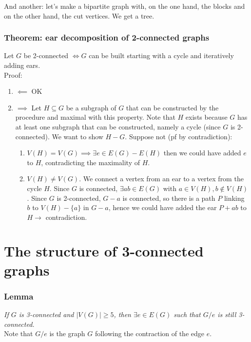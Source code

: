 		And another: let's make a bipartite graph with, on the one hand, the blocks and on the other hand, the cut vertices. We get a tree.
		
		\subsubsection{Theorem: ear decomposition of 2-connected graphs}
		Let $G$ be 2-connected $\iff G$ can be built starting with a cycle and iteratively adding ears.\\
		
		Proof: 
		\begin{enumerate}
			\item $\impliedby$ OK
			\item $\implies$ Let $H \subseteq G$ be a subgraph of $G$ that can be constructed by the procedure and maximal with this property. Note that $H$ exists because $G$ has at least one subgraph that can be constructed, namely a cycle (since $G$ is 2-connected). We want to show $H - G$. Suppose not (pf by contradiction): 
				\begin{enumerate} 
					\item $V(H) = V(G) \implies \exists e \in E(G) - E(H)$ then we could have added $e$ to $H$, contradicting the maximality of $H$.
					\item $V(H) \neq V(G)$. We connect a vertex from an ear to a vertex from the cycle $H$. Since $G$ is connected, $\exists ab \in E(G)$ with $a \in V(H), b \notin V(H)$. Since $G$ is 2-connected, $G-a$ is connected, so there is a path $P$ linking $b$ to $V(H) - \{a\}$ in $G- a$, hence we could have added the ear $P + ab$ to $H \rightarrow$ contradiction. 
				\end{enumerate}
		\end{enumerate}
		
		
	\section{The structure of 3-connected graphs}
		\subsubsection{Lemma} 
		\textit{If $G$ is 3-connected and $|V(G)| \geq 5$, then $\exists e \in E (G)$ such that $G / e$ is still 3-connected.}\\
		
		Note that $G / e$ is the graph $G$ following the contraction of the edge $e$.\\
		
